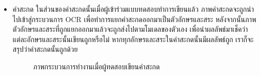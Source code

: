 \documentclass[12pt,oneside,openright,a4paper]{cpe-thai-project}
\begin{document}
\begin{itemize}
\begin{figure}[!h]
         \end{figure}
        \newpage
        \item คำสะกด
          ในส่วนของคำสะกดนั้นเมื่อผู้เข้าร่วมแบบทดสอบทำการเขียนแล้ว ภาพคำสะกดจะถูกนำไปเข้าสู่กระบวนการ OCR เพื่อทำการแยกคำสะกดออกมาเป็นตัวอักษรและสระ หลังจากนั้นภาพตัวอักษรและสระที่ถูกแยกออกมาแล้วจะถูกส่งไปตามโมเดลของตัวเอง เพื่อนำผลลัพธ์มาเช็คว่าแต่ละอักษรและสระนั้นเขียนถูกหรือไม่ หากทุกอักษรและสระในคำสะกดนั้นมีผลลัพธ์ถูก เราก็จะสรุปว่าคำสะกดนั้นถูกด้วย
          \begin{figure}[!h]\centering
            \setlength{\fboxrule}{0.2mm} %
            \setlength{\fboxsep}{1cm}
            \caption{ภาพกระบวนการทำงานเมื่อผู้ทดสอบเขียนคำสะกด}\label{fig:system}                  
           \end{figure}
        \end{itemize}
\newpage
\end{document}
